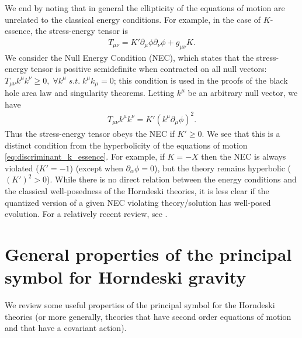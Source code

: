 \documentclass{ws-ijmpd}
\begin{document}
We end by noting that in general the ellipticity of the equations
of motion are unrelated to the classical energy conditions. 
For example, in the case of $K$-essence,
the stress-energy tensor is
\begin{align}
   T_{\mu\nu}
   =
   K'\partial_{\mu}\phi\partial_{\nu}\phi
   +
   g_{\mu\nu}
   K
   .
\end{align}
We consider the Null Energy Condition (NEC), which
states that the stress-energy tensor is positive semidefinite
when contracted on all null vectors:
$T_{\mu\nu}k^{\mu}k^{\nu}\geq0,\;\forall k^{\mu} \; s.t. \; k^{\mu}k_{\mu}=0$; 
this condition is used in the proofs of the black hole
area law and singularity theorems\cite{hawking_ellis_1973}.
Letting $k^{\mu}$ be an arbitrary null vector, we have
\begin{align}
   T_{\mu\nu}k^{\mu}k^{\nu}
   =
   K' \left(k^{\mu}\partial_{\mu}\phi\right)^2
   .
\end{align}
Thus the stress-energy tensor obeys the NEC if $K'\geq0$.
We see that this is a distinct condition from the hyperbolicity
of the equations of motion \eqref{eq:discriminant_k_essence}.
For example, if $K=-X$ then the NEC is always violated ($K'=-1$)
(except when $\partial_{\alpha}\phi=0$), but the theory
remains hyperbolic ($\left(K'\right)^2>0$).
While there is no direct relation between the energy
conditions and the classical well-posedness of the Horndeski theories,
it is less clear if the quantized version of
a given NEC violating theory/solution has well-posed evolution. 
For a relatively recent review, see .

\section{General properties of the principal symbol for Horndeski gravity
   \label{sec:general_properties_principal_symbol}
}
We review some useful properties of the 
principal symbol for the Horndeski theories (or more generally,
theories that have second order equations of motion and that have
a covariant action\cite{Papallo:2017qvl,Kovacs:2020ywu,Reall:2021voz}).
\end{document}
